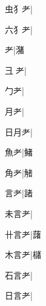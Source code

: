 \begin{multicols}{2}
{{\cjk{}虫{犭}耂}\mktsJzrVerticalBar{}{\cjk{}{\cnsym{}　}{\cnsym{}　}{\cnsym{}　}}|{}\par
{\cjk{}六{犭}耂}|{}\par
{耂}\mktsJzrVerticalBar{}{\cjk{}{\cnsym{}　}{\cnsym{}　}{\cnsym{}　}}|{\cjk{}潴}\par
{\cjk{}彐{\cnxb{}𧰨}耂}\mktsJzrVerticalBar{}{\cjk{}{\cnsym{}　}{\cnsym{}　}{\cnsym{}　}}|{}\par
{\cjk{}{\cnsym{}　}勹耂}\mktsJzrVerticalBar{}{\cjk{}{\cnsym{}　}{\cnsym{}　}{\cnsym{}　}}|{}\par
{\cjk{}{\cnsym{}　}月耂}\mktsJzrVerticalBar{}{\cjk{}{\cnsym{}　}{\cnsym{}　}{\cnsym{}　}}|{}\par
{\cjk{}日月耂}\mktsJzrVerticalBar{}{\cjk{}{\cnsym{}　}{\cnsym{}　}{\cnsym{}　}}|{}\par
{\cjk{}{\cnsym{}　}魚耂}\mktsJzrVerticalBar{}{\cjk{}{\cnsym{}　}{\cnsym{}　}{\cnsym{}　}}|{\cjk{}鯺}\par
{\cjk{}{\cnsym{}　}角耂}\mktsJzrVerticalBar{}{\cjk{}{\cnsym{}　}{\cnsym{}　}{\cnsym{}　}}|{\cjk{}觰}\par
{\cjk{}{\cnsym{}　}言耂}\mktsJzrVerticalBar{}{\cjk{}{\cnsym{}　}{\cnsym{}　}{\cnsym{}　}}|{\cjk{}諸}\par
{\cjk{}未言耂}\mktsJzrVerticalBar{}{\cjk{}{\cnsym{}　}{\cnsym{}　}{\cnsym{}　}}|{}\par
{\cjk{}卄言耂}\mktsJzrVerticalBar{}{\cjk{}{\cnsym{}　}{\cnsym{}　}{\cnsym{}　}}|{\cjk{}藷}\par
{\cjk{}木言耂}\mktsJzrVerticalBar{}{\cjk{}{\cnsym{}　}{\cnsym{}　}{\cnsym{}　}}|{\cjk{}櫧}\par
{\cjk{}石言耂}\mktsJzrVerticalBar{}{\cjk{}{\cnsym{}　}{\cnsym{}　}{\cnsym{}　}}|{}\par
{\cjk{}日言耂}\mktsJzrVerticalBar{}{\cjk{}{\cnsym{}　}{\cnsym{}　}{\cnsym{}　}}|{}\par
}
\end{multicols}
